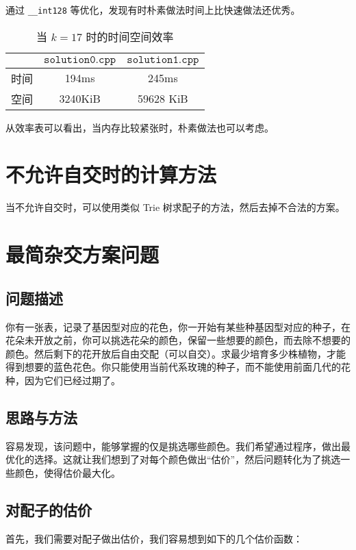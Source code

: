 \documentclass[12pt]{article} %
\begin{document}
通过 \texttt{\_\_int128} 等优化，发现有时朴素做法时间上比快速做法还优秀。

\begin{table}[htbp]
	\centering
	\caption{当 $k=17$ 时的时间空间效率}
	\begin{tabular}{c|c|c}
		& $\texttt{solution0.cpp}$ & $\texttt{solution1.cpp}$\\ \hline
		时间 & 194ms & 245ms \\ \hline
		空间 & 3240KiB & 59628 KiB 
	\end{tabular}
\end{table}

从效率表可以看出，当内存比较紧张时，朴素做法也可以考虑。

\section{不允许自交时的计算方法}

当不允许自交时，可以使用类似 Trie 树求配子的方法，然后去掉不合法的方案。

\section{最简杂交方案问题}

\subsection{问题描述}

你有一张表，记录了基因型对应的花色，你一开始有某些种基因型对应的种子，在花朵未开放之前，你可以挑选花朵的颜色，保留一些想要的颜色，而去除不想要的颜色。然后剩下的花开放后自由交配（可以自交）。求最少培育多少株植物，才能得到想要的蓝色花色。你只能使用当前代系玫瑰的种子，而不能使用前面几代的花种，因为它们已经过期了。

\subsection{思路与方法}

容易发现，该问题中，能够掌握的仅是挑选哪些颜色。我们希望通过程序，做出最优化的选择。这就让我们想到了对每个颜色做出“估价”，然后问题转化为了挑选一些颜色，使得估价最大化。

\subsection{对配子的估价}

首先，我们需要对配子做出估价，我们容易想到如下的几个估价函数：
\end{document}
